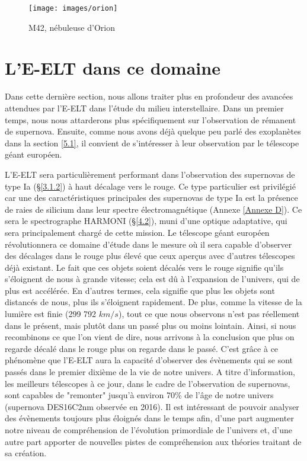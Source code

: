 \begin{figure}[H]
	\centering
	\texttt{[image: images/orion]}
	\caption[M42, nébuleuse d'Orion - astrophoto prise par René Lemoine en 2018 avec une lunette TS APO 80 et une caméra QHY10 (5 heures de pose)]{M42, nébuleuse d'Orion}
	\label{Fig. 5.1}
\end{figure}\bigskip



\section{ L'E-ELT dans ce domaine}\label{5.2}

Dans cette dernière section, nous allons traiter plus en profondeur des avancées attendues par l'E-ELT dans l'étude du milieu interstellaire. Dans un premier temps, nous nous attarderons plus spécifiquement sur l'observation de rémanent de supernova. Ensuite, comme nous avons déjà quelque peu parlé des exoplanètes dans la section \ref{5.1}, il convient de s'intéresser à leur observation par le télescope géant européen.\medskip

L'E-ELT sera particulièrement performant dans l'observation des supernovas de type Ia (§\ref{3.1.2}) à haut décalage vers le rouge. Ce type particulier est privilégié car une des caractéristiques principales des supernovas de type Ia est la présence de raies de silicium dans leur spectre électromagnétique (Annexe \ref{Annexe D}). Ce sera le spectrographe HARMONI (§\ref{4.2}), muni d'une optique adaptative, qui sera principalement chargé de cette mission. Le télescope géant européen révolutionnera ce domaine d'étude dans le mesure où il sera capable d'observer des décalages dans le rouge plus élevé que ceux aperçus avec d'autres télescopes déjà existant. Le fait que ces objets soient décalés vers le rouge signifie qu'ils s'éloignent de nous à grande vitesse; cela est dû à l'expansion de l'univers, qui de plus est accélérée. En d'autres termes, cela signifie que plus les objets sont distancés de nous, plus ils s'éloignent rapidement. De plus, comme la vitesse de la lumière est finie (299 792 $km/s$), tout ce que nous observons n'est pas réellement dans le présent, mais plutôt dans un passé plus ou moins lointain. Ainsi, si nous recombinons ce que l'on vient de dire, nous arrivons à la conclusion que plus on regarde décalé dans le rouge plus on regarde dans le passé. C'est grâce à ce phénomène que l'E-ELT aura la capacité d'observer des évènements qui se sont passés dans le premier dixième de la vie de notre univers. A titre d'information, les meilleurs télescopes à ce jour, dans le cadre de l'observation de supernovas, sont capables de "remonter" jusqu'à environ 70\% de l'âge de notre univers (supernova DES16C2nm observée en 2016). Il est intéressant de pouvoir analyser des évènements toujours plus éloignés dans le temps afin, d'une part augmenter notre niveau de compréhension de l'évolution primordiale de l'univers et, d'une autre part apporter de nouvelles pistes de compréhension aux théories traitant de sa création.\medskip

